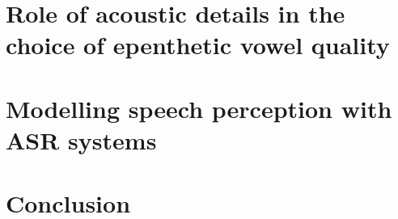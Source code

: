 \documentclass[12pt, twoside]{report}
\begin{document}
\chapter{Role of acoustic details in the choice of epenthetic vowel quality}
\minitoc

\chapter{Modelling speech perception with ASR systems}
\minitoc

\chapter{Conclusion}





\appendix
\fancyhead{}
\fancyhead[RO,LE]{\nouppercase{\leftmark}}
\fancyfoot{}
\fancyfoot[LE,RO]{\thepage}
 
\end{document}
